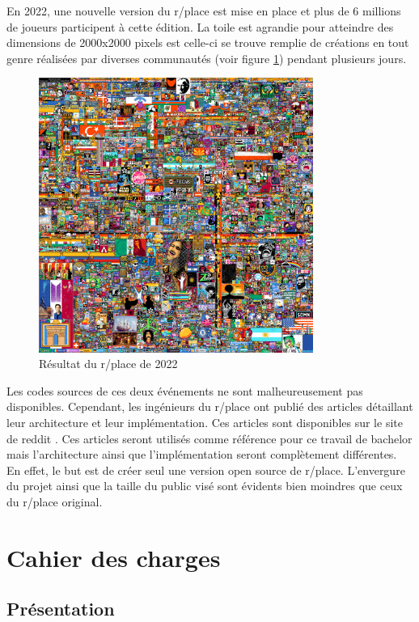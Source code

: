 En 2022, une nouvelle version du r/place est mise en place et plus de 6 millions de joueurs participent à cette édition. La toile est agrandie pour atteindre des dimensions de 2000x2000 pixels est celle-ci se trouve remplie de créations en tout genre réalisées par diverses communautés (voir figure \ref{fig:rplace2022}) pendant plusieurs jours.

\begin{figure}[H]
  \centering
  \includegraphics[width=0.8\textwidth]{./assets/figures/rplace.png}
  \caption{Résultat du r/place de 2022}
  \label{fig:rplace2022}
\end{figure}

Les codes sources de ces deux événements ne sont malheureusement pas disponibles. Cependant, les ingénieurs du r/place ont publié des articles détaillant leur architecture et leur implémentation. Ces articles sont disponibles sur le site de reddit \cite{rplace2017, rplace2022}. Ces articles seront utilisés comme référence pour ce travail de bachelor mais l'architecture ainsi que l'implémentation seront complètement différentes. En effet, le but est de créer seul une version open source de r/place. L'envergure du projet ainsi que la taille du public visé sont évidents bien moindres que ceux du r/place original.

\section{Cahier des charges}

\subsection{Présentation}

